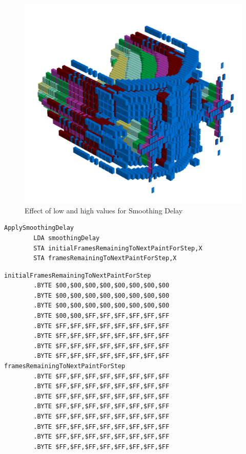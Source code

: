 \begin{figure}[H]
    \begin{adjustbox}{width=10.5cm,margin=0cm -2cm}
      \includegraphics[width=12cm]{src/delay/pattern1-45.png}%
    \end{adjustbox}
    \caption{Effect of low and high values for Smoothing Delay}
\end{figure}
                                                                           
\begin{lstlisting}[caption=From \icode{MainInterruptHandler}.]
ApplySmoothingDelay    
        LDA smoothingDelay
        STA initialFramesRemainingToNextPaintForStep,X
        STA framesRemainingToNextPaintForStep,X
\end{lstlisting}

\begin{lstlisting}[caption=Definition of \icode{framesRemainingToNextPaintForStep} and its counterpart \icode{initialFramesRemainingToNextPaintForStep}..]
initialFramesRemainingToNextPaintForStep
        .BYTE $00,$00,$00,$00,$00,$00,$00,$00
        .BYTE $00,$00,$00,$00,$00,$00,$00,$00
        .BYTE $00,$00,$00,$00,$00,$00,$00,$00
        .BYTE $00,$00,$FF,$FF,$FF,$FF,$FF,$FF
        .BYTE $FF,$FF,$FF,$FF,$FF,$FF,$FF,$FF
        .BYTE $FF,$FF,$FF,$FF,$FF,$FF,$FF,$FF
        .BYTE $FF,$FF,$FF,$FF,$FF,$FF,$FF,$FF
        .BYTE $FF,$FF,$FF,$FF,$FF,$FF,$FF,$FF
framesRemainingToNextPaintForStep
        .BYTE $FF,$FF,$FF,$FF,$FF,$FF,$FF,$FF
        .BYTE $FF,$FF,$FF,$FF,$FF,$FF,$FF,$FF
        .BYTE $FF,$FF,$FF,$FF,$FF,$FF,$FF,$FF
        .BYTE $FF,$FF,$FF,$FF,$FF,$FF,$FF,$FF
        .BYTE $FF,$FF,$FF,$FF,$FF,$FF,$FF,$FF
        .BYTE $FF,$FF,$FF,$FF,$FF,$FF,$FF,$FF
        .BYTE $FF,$FF,$FF,$FF,$FF,$FF,$FF,$FF
        .BYTE $FF,$FF,$FF,$FF,$FF,$FF,$FF,$FF
\end{lstlisting}


